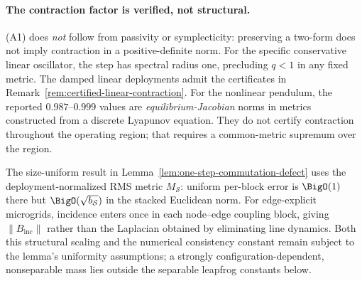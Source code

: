 

\paragraph{The contraction factor is verified, not structural.}
(A1) does \emph{not} follow from passivity or symplecticity: preserving a
two-form does not imply contraction in a positive-definite norm. For the
specific conservative linear oscillator, the step has spectral radius one,
precluding $q<1$ in any fixed metric. The damped linear deployments admit
the certificates in Remark~\ref{rem:certified-linear-contraction}.
For the nonlinear pendulum, the reported $0.987$--$0.999$ values are
\emph{equilibrium-Jacobian} norms in metrics constructed from a discrete
Lyapunov equation. They do not certify contraction throughout the operating
region; that requires a common-metric supremum over the region.

The size-uniform result in Lemma~\ref{lem:one-step-commutation-defect} uses
the deployment-normalized RMS metric $M_{\mathcal S}$: uniform per-block
error is $\BigO(1)$ there but $\BigO(\sqrt{b_{\mathcal S}})$ in the stacked
Euclidean norm. For edge-explicit microgrids, incidence enters once in each
node--edge coupling block, giving $\|B_{\mathrm{inc}}\|$ rather than the
Laplacian obtained by eliminating line dynamics. Both this structural scaling
and the numerical consistency constant remain subject to the lemma's
uniformity assumptions; a strongly configuration-dependent, nonseparable
mass lies outside the separable leapfrog constants below.



